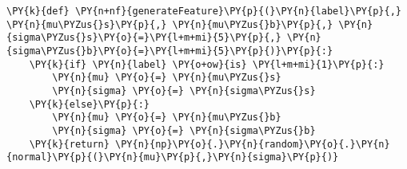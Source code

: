 {\par%
\vspace{-1\baselineskip}%
}%
\begin{notebookcell}[]%
\begin{addmargin}[\cellleftmargin]{0em}%
{\smaller%
\par%
%
\vspace{-1\smallerfontscale}%
\begin{Verbatim}[commandchars=\\\{\}]
\PY{k}{def} \PY{n+nf}{generateFeature}\PY{p}{(}\PY{n}{label}\PY{p}{,} \PY{n}{mu\PYZus{}s}\PY{p}{,} \PY{n}{mu\PYZus{}b}\PY{p}{,} \PY{n}{sigma\PYZus{}s}\PY{o}{=}\PY{l+m+mi}{5}\PY{p}{,} \PY{n}{sigma\PYZus{}b}\PY{o}{=}\PY{l+m+mi}{5}\PY{p}{)}\PY{p}{:}
    \PY{k}{if} \PY{n}{label} \PY{o+ow}{is} \PY{l+m+mi}{1}\PY{p}{:}
        \PY{n}{mu} \PY{o}{=} \PY{n}{mu\PYZus{}s}
        \PY{n}{sigma} \PY{o}{=} \PY{n}{sigma\PYZus{}s}
    \PY{k}{else}\PY{p}{:}
        \PY{n}{mu} \PY{o}{=} \PY{n}{mu\PYZus{}b}
        \PY{n}{sigma} \PY{o}{=} \PY{n}{sigma\PYZus{}b}
    \PY{k}{return} \PY{n}{np}\PY{o}{.}\PY{n}{random}\PY{o}{.}\PY{n}{normal}\PY{p}{(}\PY{n}{mu}\PY{p}{,}\PY{n}{sigma}\PY{p}{)}
\end{Verbatim}
%
\par%
\vspace{-1\smallerfontscale}}%
\end{addmargin}
\end{notebookcell}



